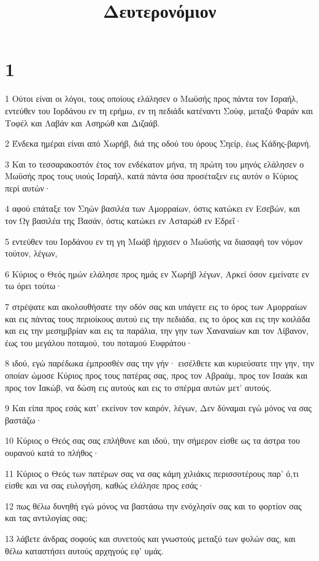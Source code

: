 

\title{Δευτερονόμιον}


\chapter{1}

\par 1 Ούτοι είναι οι λόγοι, τους οποίους ελάλησεν ο Μωϋσής προς πάντα τον Ισραήλ, εντεύθεν του Ιορδάνου εν τη ερήμω, εν τη πεδιάδι κατέναντι Σούφ, μεταξύ Φαράν και Τοφέλ και Λαβάν και Ασηρώθ και Διζαάβ.
\par 2 Ένδεκα ημέραι είναι από Χωρήβ, διά της οδού του όρους Σηείρ, έως Κάδης-βαρνή.
\par 3 Και το τεσσαρακοστόν έτος τον ενδέκατον μήνα, τη πρώτη του μηνός ελάλησεν ο Μωϋσής προς τους υιούς Ισραήλ, κατά πάντα όσα προσέταξεν εις αυτόν ο Κύριος περί αυτών·
\par 4 αφού επάταξε τον Σηών βασιλέα των Αμορραίων, όστις κατώκει εν Εσεβών, και τον Ωγ βασιλέα της Βασάν, όστις κατώκει εν Ασταρώθ εν Εδρεΐ·
\par 5 εντεύθεν του Ιορδάνου εν τη γη Μωάβ ήρχισεν ο Μωϋσής να διασαφή τον νόμον τούτον, λέγων,
\par 6 Κύριος ο Θεός ημών ελάλησε προς ημάς εν Χωρήβ λέγων, Αρκεί όσον εμείνατε εν τω όρει τούτω·
\par 7 στρέψατε και ακολουθήσατε την οδόν σας και υπάγετε εις το όρος των Αμορραίων και εις πάντας τους περιοίκους αυτού εις την πεδιάδα, εις το όρος και εις την κοιλάδα και εις την μεσημβρίαν και εις τα παράλια, την γην των Χαναναίων και τον Λίβανον, έως του μεγάλου ποταμού, του ποταμού Ευφράτου·
\par 8 ιδού, εγώ παρέδωκα έμπροσθέν σας την γήν· εισέλθετε και κυριεύσατε την γην, την οποίαν ώμοσε Κύριος προς τους πατέρας σας, προς τον Αβραάμ, προς τον Ισαάκ και προς τον Ιακώβ, να δώση εις αυτούς και εις το σπέρμα αυτών μετ' αυτούς.
\par 9 Και είπα προς εσάς κατ' εκείνον τον καιρόν, λέγων, Δεν δύναμαι εγώ μόνος να σας βαστάζω·
\par 10 Κύριος ο Θεός σας σας επλήθυνε και ιδού, την σήμερον είσθε ως τα άστρα του ουρανού κατά το πλήθος·
\par 11 Κύριος ο Θεός των πατέρων σας να σας κάμη χιλιάκις περισσοτέρους παρ' ό,τι είσθε και να σας ευλογήση, καθώς ελάλησε προς εσάς·
\par 12 πως θέλω δυνηθή εγώ μόνος να βαστάσω την ενόχλησίν σας και το φορτίον σας και τας αντιλογίας σας;
\par 13 λάβετε άνδρας σοφούς και συνετούς και γνωστούς μεταξύ των φυλών σας, και θέλω καταστήσει αυτούς αρχηγούς εφ' υμάς.
